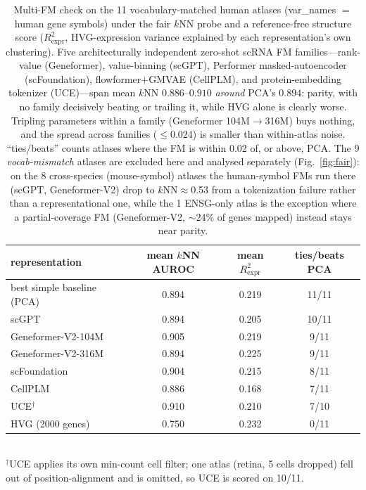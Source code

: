\documentclass[11pt]{article}
\begin{document}
\begin{table}[!ht]\centering\footnotesize
\caption{Multi-FM check on the 11 vocabulary-matched human atlases (var\_names $=$ human gene symbols) under the fair $k$NN probe and a reference-free structure score ($R^2_{\mathrm{expr}}$, HVG-expression variance explained by each representation's own clustering). Five architecturally independent zero-shot scRNA FM families---rank-value (Geneformer), value-binning (scGPT), Performer masked-autoencoder (scFoundation), flowformer$+$GMVAE (CellPLM), and protein-embedding tokenizer (UCE)---span mean $k$NN $0.886$--$0.910$ \emph{around} PCA's $0.894$: parity, with no family decisively beating or trailing it, while HVG alone is clearly worse. Tripling parameters within a family (Geneformer 104M$\to$316M) buys nothing, and the spread across families ($\le$0.024) is smaller than within-atlas noise. ``ties/beats'' counts atlases where the FM is within 0.02 of, or above, PCA. The 9 \emph{vocab-mismatch} atlases are excluded here and analysed separately (Fig.~\ref{fig:fair}): on the 8 cross-species (mouse-symbol) atlases the human-symbol FMs run there (scGPT, Geneformer-V2) drop to $k$NN${\approx}$0.53 from a tokenization failure rather than a representational one, while the 1 ENSG-only atlas is the exception where a partial-coverage FM (Geneformer-V2, ${\sim}24\%$ of genes mapped) instead stays near parity.}
\label{tab:fmscale}
\begin{tabular}{@{}lccc@{}}
\toprule
representation & mean $k$NN AUROC & mean $R^2_{\mathrm{expr}}$ & ties/beats PCA \\
\midrule
best simple baseline (PCA) & 0.894 & 0.219 & 11/11 \\
scGPT & 0.894 & 0.205 & 10/11 \\
Geneformer-V2-104M & 0.905 & 0.219 & 9/11 \\
Geneformer-V2-316M & 0.894 & 0.225 & 9/11 \\
scFoundation & 0.904 & 0.215 & 8/11 \\
CellPLM & 0.886 & 0.168 & 7/11 \\
UCE$^{\dagger}$ & 0.910 & 0.210 & 7/10 \\
HVG (2000 genes) & 0.750 & 0.232 & 0/11 \\
\bottomrule
\end{tabular}\\[2pt]
{\footnotesize $^{\dagger}$UCE applies its own min-count cell filter; one atlas (retina, 5 cells dropped) fell out of position-alignment and is omitted, so UCE is scored on 10/11.}
\end{table}
\end{document}
